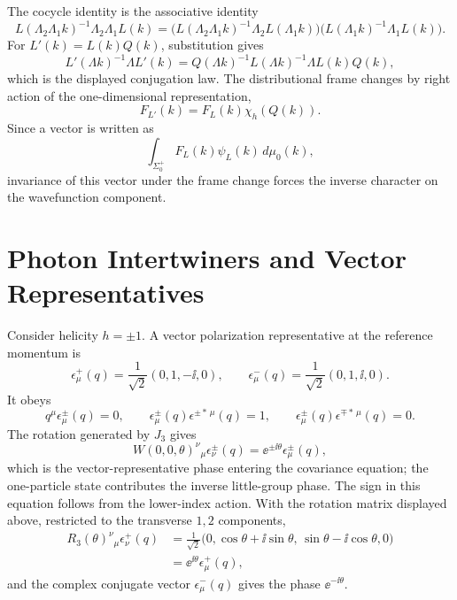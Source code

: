 The cocycle identity is the associative identity
\[
  L(\Lambda_2\Lambda_1k)^{-1}\Lambda_2\Lambda_1L(k)
  =
  \bigl(L(\Lambda_2\Lambda_1k)^{-1}\Lambda_2L(\Lambda_1k)\bigr)
  \bigl(L(\Lambda_1k)^{-1}\Lambda_1L(k)\bigr).
\]
For \(L'(k)=L(k)Q(k)\), substitution gives
\[
  L'(\Lambda k)^{-1}\Lambda L'(k)
  =
  Q(\Lambda k)^{-1}L(\Lambda k)^{-1}\Lambda L(k)Q(k),
\]
which is the displayed conjugation law.  The distributional frame changes by
right action of the one-dimensional representation,
\[
  F_{L'}(k)=F_L(k)\chi_h(Q(k)).
\]
Since a vector is written as
\[
  \int_{\Sigma_0^+} F_L(k)\psi_L(k)\,d\mu_0(k),
\]
invariance of this vector under the frame change forces the inverse character
on the wavefunction component.

\section{Photon Intertwiners and Vector Representatives}

Consider helicity \(h=\pm1\). A vector polarization representative at the
reference momentum is
\[
  \epsilon_\mu^+(q)=\frac1{\sqrt2}(0,1,-\ii,0),
  \qquad
  \epsilon_\mu^-(q)=\frac1{\sqrt2}(0,1,\ii,0).
\]
It obeys
\[
  q^\mu\epsilon_\mu^\pm(q)=0,
  \qquad
  \epsilon_\mu^\pm(q)\epsilon^{\pm *\,\mu}(q)=1,
  \qquad
  \epsilon_\mu^\pm(q)\epsilon^{\mp *\,\mu}(q)=0.
\]
The rotation generated by \(J_3\) gives
\[
  W(0,0,\theta)^\nu{}_\mu\epsilon_\nu^\pm(q)
  =
  \ee^{\pm\ii\theta}\epsilon_\mu^\pm(q),
\]
which is the vector-representative phase entering the covariance equation;
the one-particle state contributes the inverse little-group phase.
The sign in this equation follows from the lower-index action.  With the
rotation matrix displayed above, restricted to the transverse \(1,2\)
components,
\[
\begin{aligned}
  R_3(\theta)^\nu{}_\mu\epsilon_\nu^+(q)
  &=
  \frac1{\sqrt2}
  \bigl(0,\cos\theta+\ii\sin\theta,\,
          \sin\theta-\ii\cos\theta,0\bigr)  \\
  &=
  \ee^{\ii\theta}\epsilon_\mu^+(q),
\end{aligned}
\]
and the complex conjugate vector \(\epsilon_\mu^-(q)\) gives the phase
\(\ee^{-\ii\theta}\).

